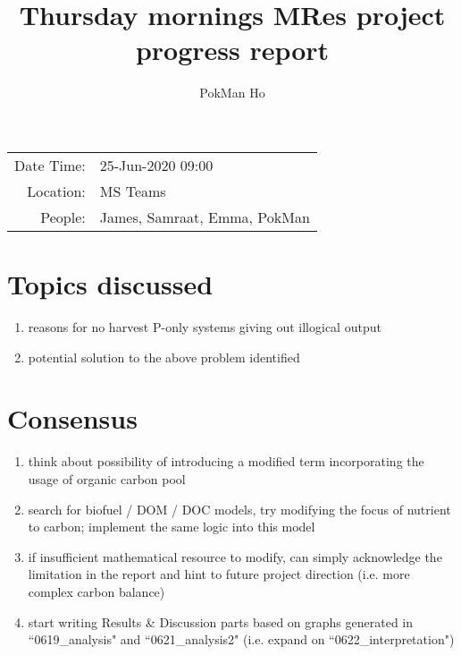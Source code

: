 \documentclass[a4paper,11pt]{article}
\title{Thursday mornings MRes project progress report}
\author{PokMan Ho}
\date{}
\begin{document}
    \maketitle
    
    \begin{tabular}{rl}
        Date Time: & 25-Jun-2020 09:00 \\
        Location: & MS Teams \\
        People: & James, Samraat, Emma, PokMan \\
    \end{tabular}
    
    \section{Topics discussed}
    \begin{enumerate}
        \item reasons for no harvest P-only systems giving out illogical output
        \item potential solution to the above problem identified
    \end{enumerate}
    
    \section{Consensus}
    \begin{enumerate}
        \item think about possibility of introducing a modified term incorporating the usage of organic carbon pool
        \item search for biofuel / DOM / DOC models, try modifying the focus of nutrient to carbon; implement the same logic into this model
        \item if insufficient mathematical resource to modify, can simply acknowledge the limitation in the report and hint to future project direction (i.e. more complex carbon balance)
        \item start writing Results \& Discussion parts based on graphs generated in ``0619\_analysis" and ``0621\_analysis2" (i.e. expand on ``0622\_interpretation")
    \end{enumerate}
    
\end{document}
